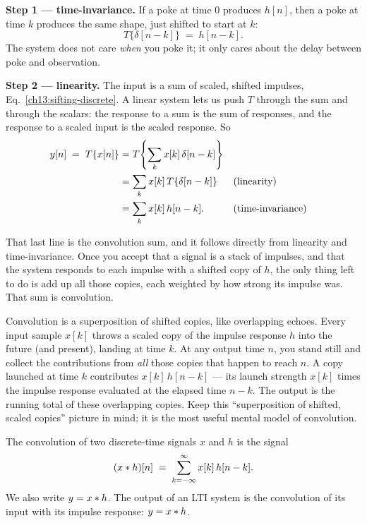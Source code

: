 \textbf{Step 1 --- time-invariance.} If a poke at time $0$ produces $h[n]$,
then a poke at time $k$ produces the same shape, just shifted to start at $k$:
\[
T\{\delta[n-k]\} \;=\; h[n-k].
\]
The system does not care \emph{when} you poke it; it only cares about the delay
between poke and observation.

\textbf{Step 2 --- linearity.} The input is a sum of scaled, shifted impulses,
Eq.~\eqref{ch13:sifting-discrete}. A linear system lets us push $T$ through the
sum and through the scalars: the response to a sum is the sum of responses, and
the response to a scaled input is the scaled response. So
\begin{align}
y[n] \;=\; T\{x[n]\}
   &= T\!\left\{ \sum_{k} x[k]\,\delta[n-k] \right\} \notag\\
   &= \sum_{k} x[k]\, T\{\delta[n-k]\}
   &&\text{(linearity)} \notag\\
   &= \sum_{k} x[k]\, h[n-k].
   &&\text{(time-invariance)}
\label{ch13:conv-discrete-derived}
\end{align}

That last line is the convolution sum, and it follows directly from
linearity and time-invariance. Once you accept that a signal is a stack of impulses, and that
the system responds to each impulse with a shifted copy of $h$, the only thing
left to do is add up all those copies, each weighted by how strong its impulse
was. That sum is convolution.

\begin{happeningbox}
Convolution is a superposition of shifted copies, like overlapping echoes. Every input sample $x[k]$ throws a
scaled copy of the impulse response $h$ into the future (and present), landing
at time $k$. At any output time $n$, you stand still and collect the
contributions from \emph{all} those copies that happen to reach $n$. A copy
launched at time $k$ contributes $x[k]\,h[n-k]$ --- its launch strength $x[k]$
times the impulse response evaluated at the elapsed time $n-k$. The output is
the running total of these overlapping copies. Keep this ``superposition of
shifted, scaled copies'' picture in mind; it is the most useful mental model of
convolution.
\end{happeningbox}

\begin{definition}
\label{ch13:def-discrete}
The convolution of two discrete-time signals $x$ and $h$ is the signal
\begin{equation}
(x \ast h)[n] \;=\; \sum_{k=-\infty}^{\infty} x[k]\,h[n-k].
\end{equation}
We also write $y = x \ast h$. The output of an LTI system is the convolution
of its input with its impulse response: $y = x \ast h$.
\end{definition}

